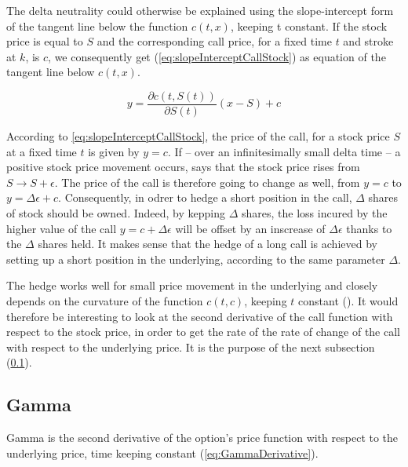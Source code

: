 \documentclass[12pt]{report}
\newcommand{\call}[2]{c\left( #1, #2\right)}
\newcommand{\St}{S\left(t\right)}
\begin{document}
The delta neutrality could otherwise be explained using the slope-intercept form of the tangent line below the function $\call{t}{x}$, keeping t constant. If the stock price is equal to $S$ and the corresponding call price, for a fixed time $t$ and stroke at $k$, is $c$, we consequently get (\ref{eq:slopeInterceptCallStock}) as equation of the tangent line below $\call{t}{x}$.
\begin{center}
  \begin{equation}
       y  =  \frac{\partial \call{t}{\St}}{\partial \St}  ( x - S) + c
       \label{eq:slopeInterceptCallStock}
  \end{equation}
\end{center}
According to \ref{eq:slopeInterceptCallStock}, the price of the call, for a stock price $S$ at a fixed time $t$ is given by $y = c$.
If -- over an infinitesimally small delta time -- a positive stock price movement occurs, says that the stock price rises from $S \to S + \epsilon$. The price of the call is therefore going to change as well, from $y = c$ to $y = \Delta \epsilon + c$.
Consequently, in odrer to hedge a short position in the call, $\Delta$ shares of stock should be owned. Indeed, by kepping $\Delta$ shares, the loss incured by the higher value of the call $y = c + \Delta \epsilon$ will be offset by an inscrease of $\Delta \epsilon$ thanks to the $\Delta$ shares held.
It makes sense that the hedge of a long call is achieved by setting up a short position in the underlying, according to the same parameter $\Delta$.

The hedge works well for small price movement in the underlying and closely depends on the curvature of the function $\call{t}{c}$, keeping $t$ constant (\citet{shreve}).
It would therefore be interesting to look at the second derivative of the call function with respect to the stock price, in order to get the rate of the rate of change of the call with respect to the underlying price.
It is the purpose of the next subsection (\ref{sub:Gamma}).


\subsection{Gamma}
\label{sub:Gamma}

Gamma is the second derivative of the option's price function with respect to the underlying price, time keeping constant (\ref{eq:GammaDerivative}). 
\end{document}
